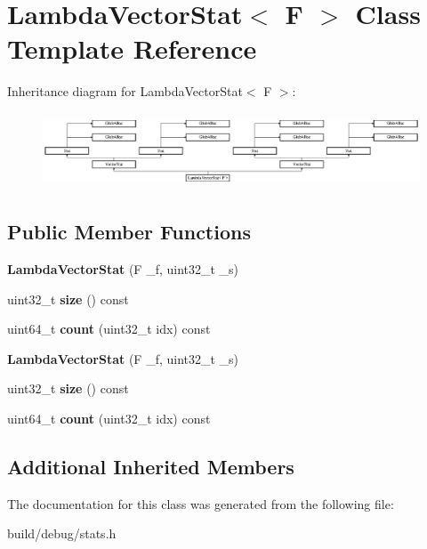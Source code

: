 \hypertarget{classLambdaVectorStat}{\section{Lambda\-Vector\-Stat$<$ F $>$ Class Template Reference}
\label{classLambdaVectorStat}
}
Inheritance diagram for Lambda\-Vector\-Stat$<$ F $>$\-:\begin{figure}[H]
\begin{center}
\leavevmode
\includegraphics[height=2.258065cm]{classLambdaVectorStat}
\end{center}
\end{figure}
\subsection*{Public Member Functions}
\begin{DoxyCompactItemize}
\item 
\hypertarget{classLambdaVectorStat_a36d12c74f96d863725cb1b5b402e524b}{{\bfseries Lambda\-Vector\-Stat} (F \-\_\-f, uint32\-\_\-t \-\_\-s)}\label{classLambdaVectorStat_a36d12c74f96d863725cb1b5b402e524b}

\item 
\hypertarget{classLambdaVectorStat_a63e1c70625f3c350e59a99a7e2c94464}{uint32\-\_\-t {\bfseries size} () const }\label{classLambdaVectorStat_a63e1c70625f3c350e59a99a7e2c94464}

\item 
\hypertarget{classLambdaVectorStat_a7d53721746baf822cab7ecaffdc3cc0e}{uint64\-\_\-t {\bfseries count} (uint32\-\_\-t idx) const }\label{classLambdaVectorStat_a7d53721746baf822cab7ecaffdc3cc0e}

\item 
\hypertarget{classLambdaVectorStat_a36d12c74f96d863725cb1b5b402e524b}{{\bfseries Lambda\-Vector\-Stat} (F \-\_\-f, uint32\-\_\-t \-\_\-s)}\label{classLambdaVectorStat_a36d12c74f96d863725cb1b5b402e524b}

\item 
\hypertarget{classLambdaVectorStat_a63e1c70625f3c350e59a99a7e2c94464}{uint32\-\_\-t {\bfseries size} () const }\label{classLambdaVectorStat_a63e1c70625f3c350e59a99a7e2c94464}

\item 
\hypertarget{classLambdaVectorStat_a7d53721746baf822cab7ecaffdc3cc0e}{uint64\-\_\-t {\bfseries count} (uint32\-\_\-t idx) const }\label{classLambdaVectorStat_a7d53721746baf822cab7ecaffdc3cc0e}

\end{DoxyCompactItemize}
\subsection*{Additional Inherited Members}


The documentation for this class was generated from the following file\-:\begin{DoxyCompactItemize}
\item 
build/debug/stats.\-h\end{DoxyCompactItemize}

